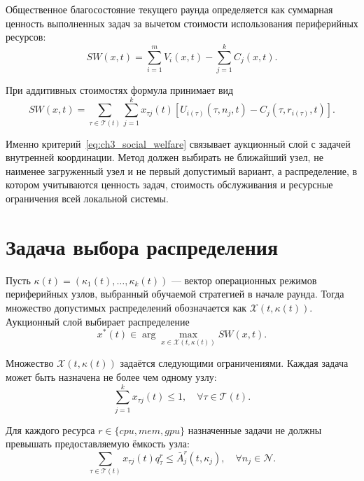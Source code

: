 Общественное благосостояние текущего раунда определяется как суммарная ценность выполненных задач за вычетом стоимости использования периферийных ресурсов:
\begin{equation}
SW(x,t)=\sum_{i=1}^{m}V_i(x,t)-\sum_{j=1}^{k}C_j(x,t).
\label{eq:ch3_social_welfare}
\end{equation}

При аддитивных стоимостях формула принимает вид
\begin{equation}
SW(x,t)=
\sum_{\tau \in \mathcal{T}(t)}\sum_{j=1}^{k}x_{\tau j}(t)
\left[U_{i(\tau)}(\tau,n_j,t)-C_j(\tau,r_{i(\tau)},t)\right].
\label{eq:ch3_social_welfare_expanded}
\end{equation}

Именно критерий~\eqref{eq:ch3_social_welfare} связывает аукционный слой с задачей внутренней координации. Метод должен выбирать не ближайший узел, не наименее загруженный узел и не первый допустимый вариант, а распределение, в котором учитываются ценность задач, стоимость обслуживания и ресурсные ограничения всей локальной системы.

\section{Задача выбора распределения}

Пусть $\kappa(t)=(\kappa_1(t),\ldots,\kappa_k(t))$ --- вектор операционных режимов периферийных узлов, выбранный обучаемой стратегией в начале раунда. Тогда множество допустимых распределений обозначается как $\mathcal{X}(t,\kappa(t))$. Аукционный слой выбирает распределение
\begin{equation}
x^*(t) \in \arg\max_{x \in \mathcal{X}(t,\kappa(t))} SW(x,t).
\label{eq:ch3_wdp}
\end{equation}

Множество $\mathcal{X}(t,\kappa(t))$ задаётся следующими ограничениями. Каждая задача может быть назначена не более чем одному узлу:
\begin{equation}
\sum_{j=1}^{k}x_{\tau j}(t)\leq 1,\quad \forall \tau \in \mathcal{T}(t).
\label{eq:ch3_single_assignment}
\end{equation}

Для каждого ресурса $r\in\{cpu,mem,gpu\}$ назначенные задачи не должны превышать предоставляемую ёмкость узла:
\begin{equation}
\sum_{\tau \in \mathcal{T}(t)}x_{\tau j}(t)q^r_{\tau}\leq \bar{A}^{r}_{j}(t,\kappa_j),\quad \forall n_j\in\mathcal{N}.
\label{eq:ch3_capacity_constraint}
\end{equation}

